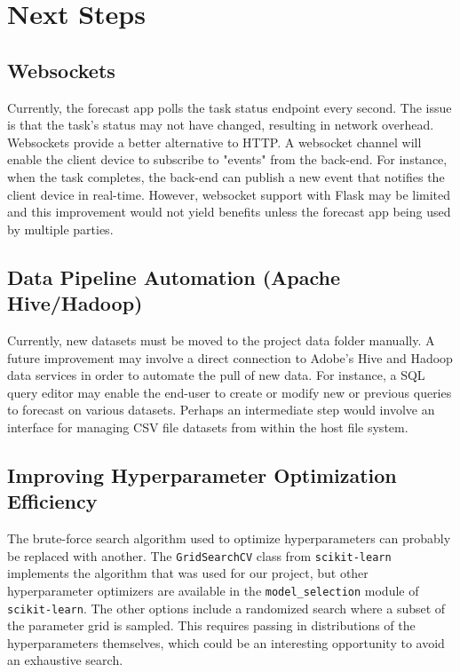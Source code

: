\documentclass[11pt, oneside, authoryear]{report}
\begin{document}
\section{Next Steps}
\subsection{Websockets}
Currently, the forecast app polls the task status endpoint every second. The issue is that the task's status may not have changed, resulting in network overhead. Websockets provide a better alternative to HTTP. A websocket channel will enable the client device to subscribe to "events" from the back-end. For instance, when the task completes, the back-end can publish a new event that notifies the client device in real-time. However, websocket support with Flask may be limited and this improvement would not yield benefits unless the forecast app being used by multiple parties.

\subsection{Data Pipeline Automation (Apache Hive/Hadoop)}
Currently, new datasets must be moved to the project data folder manually. A future improvement may involve a direct connection to Adobe's Hive and Hadoop data services in order to automate the pull of new data. For instance, a SQL query editor may enable the end-user to create or modify new or previous queries to forecast on various datasets. Perhaps an intermediate step would involve an interface for managing CSV file datasets from within the host file system.

\subsection{Improving Hyperparameter Optimization Efficiency}
\label{improving_hyperparameter_optimization_efficiency}
The brute-force search algorithm used to optimize hyperparameters can probably be replaced with another. The \texttt{GridSearchCV} class from \texttt{scikit-learn} implements the algorithm that was used for our project, but other hyperparameter optimizers are available in the \texttt{model\_selection} module of \texttt{scikit-learn}. The other options include a randomized search where a subset of the parameter grid is sampled. This requires passing in distributions of the hyperparameters themselves, which could be an interesting opportunity to avoid an exhaustive search.
\end{document}
